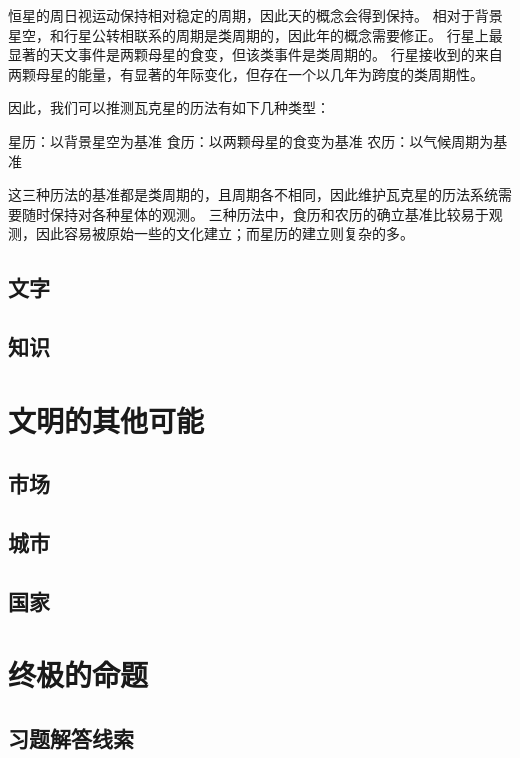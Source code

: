 \documentclass[a4paper,10.5pt]{book}
\begin{document}
恒星的周日视运动保持相对稳定的周期，因此天的概念会得到保持。
相对于背景星空，和行星公转相联系的周期是类周期的，因此年的概念需要修正。
行星上最显著的天文事件是两颗母星的食变，但该类事件是类周期的。
行星接收到的来自两颗母星的能量，有显著的年际变化，但存在一个以几年为跨度的类周期性。

因此，我们可以推测瓦克星的历法有如下几种类型：

星历：以背景星空为基准
食历：以两颗母星的食变为基准
农历：以气候周期为基准

这三种历法的基准都是类周期的，且周期各不相同，因此维护瓦克星的历法系统需要随时保持对各种星体的观测。
三种历法中，食历和农历的确立基准比较易于观测，因此容易被原始一些的文化建立；而星历的建立则复杂的多。

\section{文字}

\section{知识}



\chapter{文明的其他可能}

\section{市场}

\section{城市}

\section{国家}



\chapter{终极的命题}



\begin{appendices}
\chapter{习题解答线索}



\end{appendices}
\end{document}
